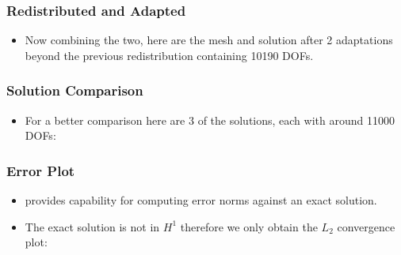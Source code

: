 \frame
{
  \frametitle{Redistributed and Adapted}
  \begin{itemize}[<+->]
    \item Now combining the two, here are the mesh and solution after 2 adaptations beyond the previous redistribution containing 10190 DOFs.
      \begin{figure}[!htb]
        \begin{center}
        \end{center}
      \end{figure}
  \end{itemize}
}

\frame
{
  \frametitle{Solution Comparison}
  \begin{itemize}[<+->]
    \item For a better comparison here are 3 of the solutions, each with around 11000 DOFs:
      \begin{figure}[!htb]
        \begin{center}
        \end{center}
      \end{figure}
  \end{itemize}
}

\frame
{
  \frametitle{Error Plot}
  \begin{itemize}[<+->]
    \item \libMesh{} provides capability for computing error norms against an exact solution.
    \item The exact solution is not in $H^1$ therefore we only obtain
the $L_2$ convergence plot:
      \begin{figure}[!htb]
      \begin{center}
      \end{center}
      \end{figure}
  \end{itemize}
}


